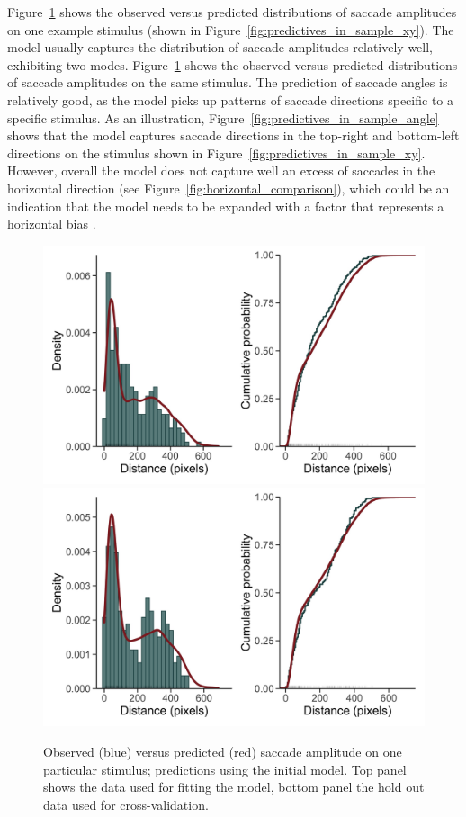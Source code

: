 \documentclass{article}
\begin{document}
Figure~\ref{fig:predictives_in_sample_amplitude} shows the observed versus predicted distributions of saccade amplitudes on one example stimulus (shown in Figure~\ref{fig:predictives_in_sample_xy}). The model usually captures the distribution of saccade amplitudes relatively well, exhibiting two modes. Figure~\ref{fig:predictives_in_sample_amplitude} shows the observed versus predicted distributions of saccade amplitudes on the same stimulus. The prediction of saccade angles is relatively good, as the model picks up patterns of saccade directions specific to a specific stimulus. As an illustration, Figure~\ref{fig:predictives_in_sample_angle} shows that the model captures saccade directions in the top-right and bottom-left directions on the stimulus shown in Figure~\ref{fig:predictives_in_sample_xy}. However, overall the model does not capture well an excess of saccades in the horizontal direction (see Figure~\ref{fig:horizontal_comparison}), which could be an indication that the model needs to be expanded with a factor that represents a horizontal bias \citep{renswoude2016horizontal}.

\begin{figure}
    \centering
    \includegraphics[width=\textwidth]{figures/fit_model/in_sample/amplitude/1251.jpg}
    \includegraphics[width=\textwidth]{figures/fit_model/out_sample/amplitude/1251.jpg}
    \caption{Observed (blue) versus predicted (red) saccade amplitude on one particular stimulus; predictions using the initial model. Top panel shows the data used for fitting the model, bottom panel the hold out data used for cross-validation.}
    \label{fig:predictives_in_sample_amplitude}
\end{figure}
\end{document}
